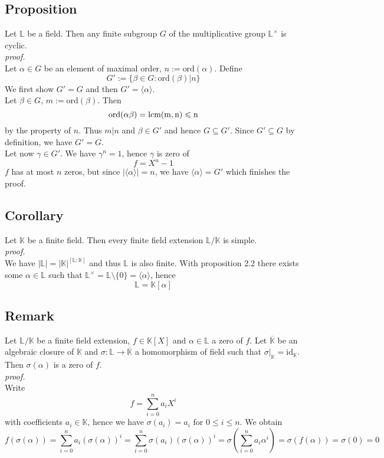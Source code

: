 \documentclass[12pt]{book}
\begin{document}
\begin{spacing}{1.3}
\subsection{Proposition} %
Let $\mathbb{L}$ be a field. Then any finite subgroup $G$ of the multiplicative group $\mathbb{L}^{\times}$ is cyclic.\\
\textit{proof.}\\
Let $\alpha \in G$ be an element of maximal order, $n :=\textrm{ord}(\alpha)$. Define $$G':=\{\beta \in G: \textrm{ord}(\beta) \big \vert n \}$$
We first show $G'=G$ and then $G'=\langle \alpha \rangle$.\\
Let $\beta \in G$, $m:= \textrm{ord}(\beta)$. Then $$\rm{ord}(\alpha \beta)=lcm(m,n)\leqslant n$$by the property of $n$. Thus $m \big \vert n$ and $\beta \in G'$ and hence $G \subseteq G'$. Since $G' \subseteq G$ by definition, we have $G'=G$.\\
Let now $\gamma \in G'$. We have $\gamma^n=1$, hence $\gamma$ is zero of $$f= X^n-1$$$f$ has at most $n$ zeros, but since $\vert\langle \alpha \rangle\vert=n$, we have $\langle \alpha \rangle = G'$ which finishes the proof.

\subsection{Corollary} %
Let $\mathbb{K}$ be a finite field. Then every finite field extension $\mathbb{L}/\mathbb{K}$ is simple.\\
\textit{proof.}\\
We have $|\mathbb{L}|=|\mathbb{K}|^{[\mathbb{L}:\mathbb{K}]}$ and thus $\mathbb{L}$ is also finite. With proposition 2.2 there exists some $\alpha \in \mathbb{L}$ such that\linebreak
$\mathbb{L}^{\times}=\mathbb{L} \setminus \{0\}=\langle \alpha \rangle$, hence $$\mathbb{L}=\mathbb{K}[\alpha]$$

\subsection{Remark} %
Let $\mathbb{L}/\mathbb{K}$ be a finite field extension, $f \in \mathbb{K}[X]$ and $\alpha \in \mathbb{L}$ a zero of $f$. Let $\overline{\mathbb{K}}$ be an algebraic closure of $\mathbb{K}$ and $\sigma: \mathbb{L} \longrightarrow \overline{\mathbb{K}}$ a homomorphism of field such that $\sigma|_{\mathbb{K}}=\textrm{id}_{\mathbb{K}}$.\\
Then $\sigma(\alpha)$ is a zero of $f$.
\pagebreak \\
\textit{proof.}\\
Write $$f=\sum_{i=0}^n a_i X^{i}$$ with coefficients $a_i \in \mathbb{K}$, hence we have $\sigma(a_i)=a_i$ for $0\leqslant i \leqslant n$. We obtain
$$f\left(\sigma(\alpha)\right)=\sum_{i=0}^n a_i \left(\sigma(\alpha)\right)^{i}=\sum_{i=0}^n \sigma(a_i) \left(\sigma(\alpha)\right)^{i}=\sigma\left(\sum_{i=0}^n a_i \alpha^{i}\right)=\sigma\left(f(\alpha)\right)=\sigma(0)=0$$


\end{spacing}
\end{document}
